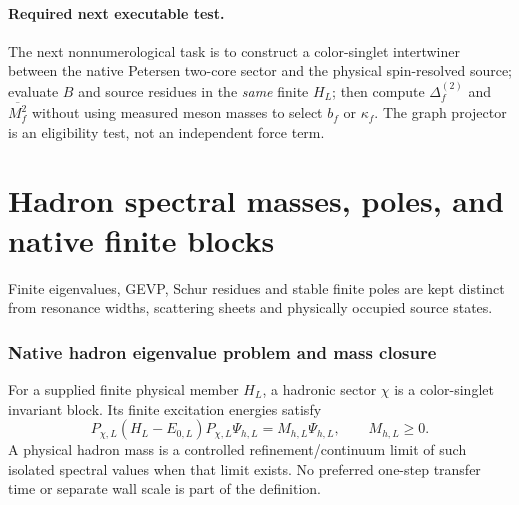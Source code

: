 \documentclass[12pt,a4paper]{article}
\begin{document}
\paragraph{Required next executable test.}
The next nonnumerological task is to construct a color-singlet
intertwiner between the native Petersen two-core sector and the
physical spin-resolved source; evaluate $B$ and source residues in
the \emph{same} finite $H_L$; then compute
$\Delta_f^{(2)}$ and $\overline{M_f^2}$ without using measured
meson masses to select $b_f$ or $\kappa_f$.  The graph projector is
an eligibility test, not an independent force term.


\section{Hadron spectral masses, poles, and native finite blocks}
\label{p11:sec:v237-b3}
Finite eigenvalues, GEVP, Schur residues and stable finite poles are kept distinct from resonance widths, scattering sheets and physically occupied source states.

\subsubsection{Native hadron eigenvalue problem and mass closure}
\label{p11:subsec:native-hadron-eigenvalue-mass-closure}

\begin{definition}
\label{p11:def:hadronic-eigenvalue-problem}
For a supplied finite physical member \(H_L\), a hadronic sector \(\chi\) is a color-singlet invariant block.  Its finite excitation energies satisfy
\begin{equation}
\label{p11:eq:hadron-eigenvalue-problem}
P_{\chi,L}(H_L-E_{0,L})P_{\chi,L}\Psi_{h,L}=M_{h,L}\Psi_{h,L},
\qquad M_{h,L}\ge0.
\end{equation}
A physical hadron mass is a controlled refinement/continuum limit of such isolated spectral values when that limit exists.  No preferred one-step transfer time or separate wall scale is part of the definition.
\end{definition}
\end{document}
